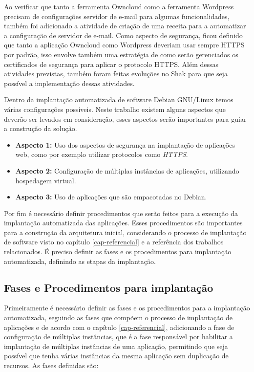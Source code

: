 Ao verificar que tanto a ferramenta Owncloud como a ferramenta Wordpress precisam
de configurações servidor de e-mail para algumas funcionalidades, também foi adicionado
a atividade de criação de uma receita para a automatizar a configuração de
servidor de e-mail. Como aspecto de segurança, ficou definido que tanto a aplicação
Owncloud como Wordpress deveriam usar sempre HTTPS por padrão, isso envolve também
uma estratégia de como serão gerenciados os certificados de segurança para aplicar
o protocolo HTTPS. Além dessas atividades previstas, também foram feitas evoluções
no Shak para que seja possível a implementação dessas atividades.

Dentro da implantação automatizada de software Debian GNU/Linux temos várias
configurações possíveis. Neste trabalho existem alguns aspectos que 
deverão ser levados em consideração, esses aspectos serão importantes para 
guiar a construção da solução.

\begin{itemize}
  \item  \textbf{Aspecto 1:} Uso dos aspectos de segurança na implantação de aplicações web,
   como por exemplo utilizar protocolos como \textit{HTTPS}.
  \item  \textbf{Aspecto 2:} Configuração de múltiplas instâncias de
   aplicações, utilizando hospedagem virtual.
  \item  \textbf{Aspecto 3:} Uso de aplicações que são empacotadas no Debian.
\end{itemize}

Por fim é necessário definir procedimentos que serão
feitos para a execução da implantação automatizada das aplicações. Esses procedimentos são
importantes para a construção da arquitetura inicial, considerando
o processo de implantação de software visto no capítulo \ref{cap-referencial}
e a referência dos trabalhos relacionados. É preciso definir as fases e os
procedimentos para implantação automatizada, definindo as etapas
da implantação.

\subsection{Fases e Procedimentos para implantação}
\label{sec:fases}

Primeiramente é necessário definir as fases e os procedimentos para a implantação automatizada,
seguindo as fases que compõem o processo de implantação de aplicações e de acordo
com o capítulo \ref{cap-referencial}, adicionando a fase de configuração de múltiplas
instâncias, que é a fase responsável por habilitar a implantação de múltiplas 
instâncias de uma aplicação, permitindo que seja possível que 
tenha várias instâncias da mesma aplicação sem duplicação de recursos. As fases 
definidas são:

